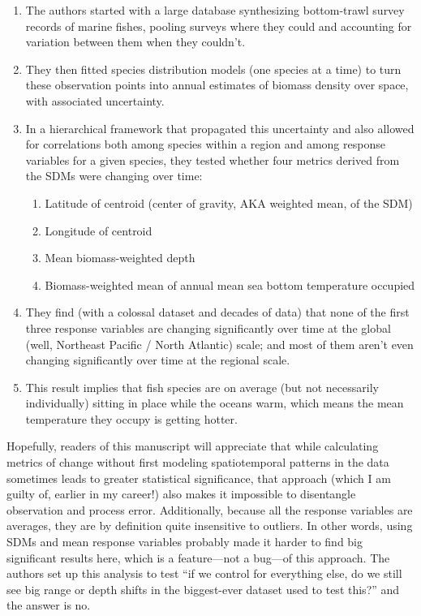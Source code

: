 \documentclass[11pt]{article}
\newcommand{\reviewer}[1]{\par\medskip\noindent\textcolor{revcolor}{#1}\par}
\begin{document}
\reviewer{%
\begin{enumerate}
    \item The authors started with a large database synthesizing bottom-trawl survey records of marine fishes, pooling surveys where they could and accounting for variation between them when they couldn't.
    \item They then fitted species distribution models (one species at a time) to turn these observation points into annual estimates of biomass density over space, with associated uncertainty.
    \item In a hierarchical framework that propagated this uncertainty and also allowed for correlations both among species within a region and among response variables for a given species, they tested whether four metrics derived from the SDMs were changing over time:
    \begin{enumerate}
        \item Latitude of centroid (center of gravity, AKA weighted mean, of the SDM)
        \item Longitude of centroid
        \item Mean biomass-weighted depth
        \item Biomass-weighted mean of annual mean sea bottom temperature occupied
    \end{enumerate}
    \item They find (with a colossal dataset and decades of data) that none of the first three response variables are changing significantly over time at the global (well, Northeast Pacific / North Atlantic) scale; and most of them aren't even changing significantly over time at the regional scale. 
    \item This result implies that fish species are on average (but not necessarily individually) sitting in place while the oceans warm, which means the mean temperature they occupy is getting hotter.
\end{enumerate}}

\reviewer{Hopefully, readers of this manuscript will appreciate that while calculating metrics of change without first modeling spatiotemporal patterns in the data sometimes leads to greater statistical significance, that approach (which I am guilty of, earlier in my career!) also makes it impossible to disentangle observation and process error. Additionally, because all the response variables are
averages, they are by definition quite insensitive to outliers. In other words, using SDMs and mean response variables probably made it harder to find big significant results here, which is a feature---not a bug---of this approach. The authors set up this analysis to test ``if we control for everything else, do we still see big range or depth shifts in the biggest-ever dataset used to test this?'' and the answer is no.}
\end{document}
